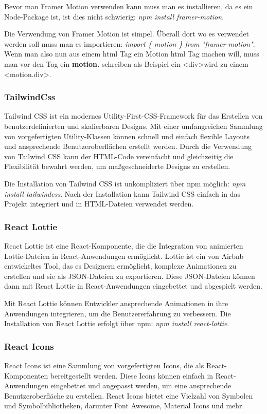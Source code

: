 Bevor man Framer Motion verwenden kann muss man es installieren, da es ein Node-Package ist, ist dies nicht schwierig: \emph{npm install framer-motion}.

Die Verwendung von Framer Motion ist simpel. Überall dort wo es verwendet werden soll muss man es importieren: \emph{import \{ motion \} from "framer-motion"}.
Wenn man also nun aus einem html Tag ein Motion html Tag machen will, muss man vor den Tag ein \textbf{motion.} schreiben als Beispiel ein \textless div\textgreater wird zu einem \textless motion.div\textgreater.   



\subsubsection*{TailwindCss}
Tailwind CSS ist ein modernes Utility-First-CSS-Framework für das Erstellen von benutzerdefinierten und skalierbaren Designs. Mit einer umfangreichen Sammlung von vorgefertigten Utility-Klassen können schnell und einfach flexible Layouts und ansprechende Benutzeroberflächen erstellt werden. Durch die Verwendung von Tailwind CSS kann der HTML-Code vereinfacht und gleichzeitig die Flexibilität bewahrt werden, um maßgeschneiderte Designs zu erstellen. 

Die Installation von Tailwind CSS ist unkompliziert über npm möglich: \emph{npm install tailwindcss}. Nach der Installation kann Tailwind CSS einfach in das Projekt integriert und in HTML-Dateien verwendet werden.

\subsubsection*{React Lottie}
React Lottie ist eine React-Komponente, die die Integration von animierten Lottie-Dateien in React-Anwendungen ermöglicht. Lottie ist ein von Airbnb entwickeltes Tool, das es Designern ermöglicht, komplexe Animationen zu erstellen und sie als JSON-Dateien zu exportieren. Diese JSON-Dateien können dann mit React Lottie in React-Anwendungen eingebettet und abgespielt werden. 

Mit React Lottie können Entwickler ansprechende Animationen in ihre Anwendungen integrieren, um die Benutzererfahrung zu verbessern. Die Installation von React Lottie erfolgt über npm: \emph{npm install react-lottie}.

\subsubsection*{React Icons}
React Icons ist eine Sammlung von vorgefertigten Icons, die als React-Komponenten bereitgestellt werden. Diese Icons können einfach in React-Anwendungen eingebettet und angepasst werden, um eine ansprechende Benutzeroberfläche zu erstellen. React Icons bietet eine Vielzahl von Symbolen und Symbolbibliotheken, darunter Font Awesome, Material Icons und mehr. 

